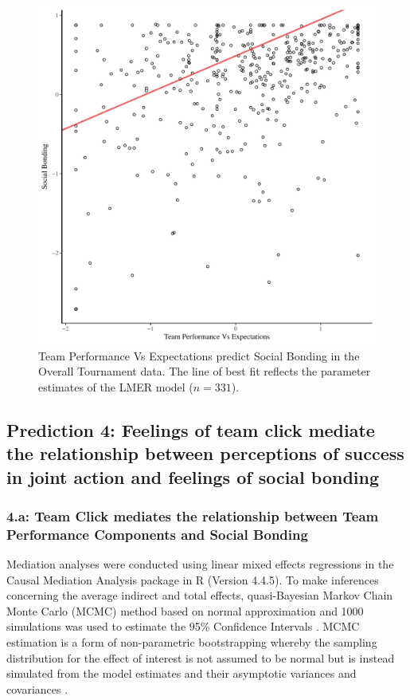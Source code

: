 \begin{CJK}{UTF8}{gbsn}
   \begin{figure}[htbp]
     \centering
   \includegraphics[scale=.5]{images/teamPerfBondOverallModelSlope.pdf}
     \caption{Team Performance Vs Expectations predict Social Bonding in the Overall Tournament data. The line of best fit reflects the parameter estimates of the LMER model ($n = 331$).}
     \label{fig:teamPerfBondOverallModelSlope}
   \end{figure}



\subsection{Prediction 4: Feelings of team click mediate the relationship between perceptions of success in joint action and feelings of social bonding}

  \subsubsection{4.a: Team Click mediates the relationship between Team Performance Components and Social Bonding}

  Mediation analyses were conducted using linear mixed effects regressions in the Causal Mediation Analysis package in R (Version 4.4.5).  To make inferences concerning the average indirect and total effects, quasi-Bayesian Markov Chain Monte Carlo (MCMC) method based on normal approximation and 1000 simulations was used to estimate the 95\% Confidence Intervals \citep{Tofighi2016a,Imai2010}. MCMC estimation is a form of non-parametric bootstrapping whereby the sampling distribution for the effect of interest is not assumed to be normal but is instead simulated from the model estimates and their asymptotic variances and covariances \cite{Preacher2008}.


\end{CJK}
